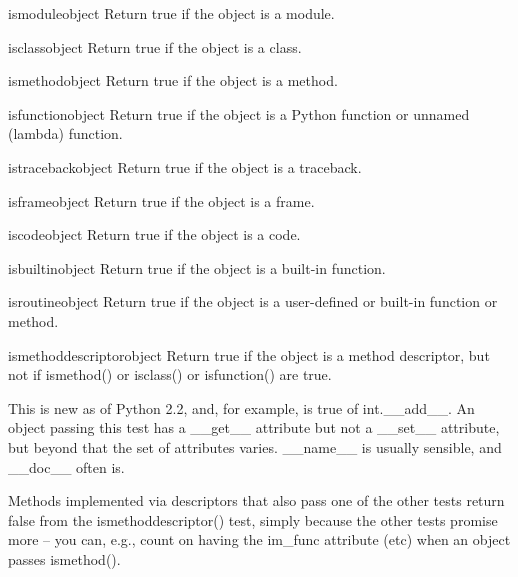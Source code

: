 \begin{funcdesc}{ismodule}{object}
  Return true if the object is a module.
\end{funcdesc}

\begin{funcdesc}{isclass}{object}
  Return true if the object is a class.
\end{funcdesc}

\begin{funcdesc}{ismethod}{object}
  Return true if the object is a method.
\end{funcdesc}

\begin{funcdesc}{isfunction}{object}
  Return true if the object is a Python function or unnamed (lambda) function.
\end{funcdesc}

\begin{funcdesc}{istraceback}{object}
  Return true if the object is a traceback.
\end{funcdesc}

\begin{funcdesc}{isframe}{object}
  Return true if the object is a frame.
\end{funcdesc}

\begin{funcdesc}{iscode}{object}
  Return true if the object is a code.
\end{funcdesc}

\begin{funcdesc}{isbuiltin}{object}
  Return true if the object is a built-in function.
\end{funcdesc}

\begin{funcdesc}{isroutine}{object}
  Return true if the object is a user-defined or built-in function or method.
\end{funcdesc}

\begin{funcdesc}{ismethoddescriptor}{object}
  Return true if the object is a method descriptor, but not if ismethod() or 
  isclass() or isfunction() are true.

  This is new as of Python 2.2, and, for example, is true of int.__add__.
  An object passing this test has a __get__ attribute but not a __set__
  attribute, but beyond that the set of attributes varies.  __name__ is
  usually sensible, and __doc__ often is.

  Methods implemented via descriptors that also pass one of the other
  tests return false from the ismethoddescriptor() test, simply because
  the other tests promise more -- you can, e.g., count on having the
  im_func attribute (etc) when an object passes ismethod().
\end{funcdesc}

